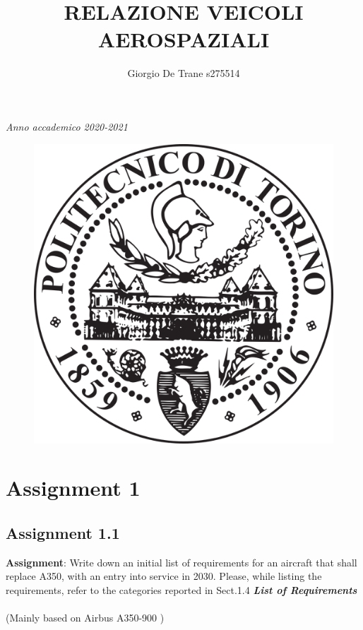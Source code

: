 \documentclass{article}
\author{Giorgio De Trane s275514}
\title{\textbf{RELAZIONE VEICOLI AEROSPAZIALI}}
\begin{document}
\maketitle
\begin{center}
    \textit{Anno accademico 2020-2021}
\end{center}
\begin{figure}[h!]
    \centering
    \includegraphics[width=\textwidth]{Sources/Plots_and_Pictures/polito_logo.png}\\
\end{figure}
\pagebreak
\tableofcontents
\pagebreak
\section{Assignment 1\label{Assignment_1}}
\subsection{Assignment 1.1\label{Assignment_1.1}}

\textbf{Assignment}: Write down an initial list of requirements for an
aircraft that shall replace A350, with an entry into service in 2030.
Please, while listing the requirements, refer to the categories
reported in Sect.1.4
\newline
\newline
\textbf{\textit{List of Requirements}}\\\\ (Mainly based on Airbus A350-900 \autocite{Airbus_A350-900})
\\ 
\end{document}
